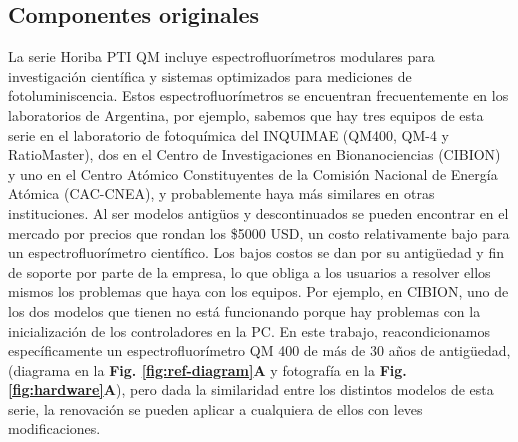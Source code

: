 \subsection{Componentes originales}

La serie Horiba PTI QM incluye espectrofluorímetros modulares para investigación científica y sistemas optimizados para mediciones de fotoluminiscencia.
Estos espectrofluorímetros se encuentran frecuentemente en los laboratorios de Argentina, por ejemplo, sabemos que hay tres equipos de esta serie en el laboratorio de fotoquímica del INQUIMAE (QM400, QM-4 y RatioMaster), dos en el Centro de Investigaciones en Bionanociencias (CIBION) y uno en el Centro Atómico Constituyentes de la Comisión Nacional de Energía Atómica (CAC-CNEA), y probablemente haya más similares en otras instituciones.
Al ser modelos antigüos y descontinuados se pueden encontrar en el mercado por precios que rondan los \$5000 USD, un costo relativamente bajo para un espectrofluorímetro científico.
Los bajos costos se dan por su antigüedad y fin de soporte por parte de la empresa, lo que obliga a los usuarios a resolver ellos mismos los problemas que haya con los equipos.
Por ejemplo, en CIBION, uno de los dos modelos que tienen no está funcionando porque hay problemas con la inicialización de los controladores en la PC.
En este trabajo, reacondicionamos específicamente un espectrofluorímetro QM 400 de más de 30 años de antigüedad,  (diagrama en la \textbf{Fig. \ref{fig:ref-diagram}A} y fotografía en la \textbf{Fig. \ref{fig:hardware}A}), pero dada la similaridad entre los distintos modelos de esta serie, la renovación se pueden aplicar a cualquiera de ellos con leves modificaciones. 

